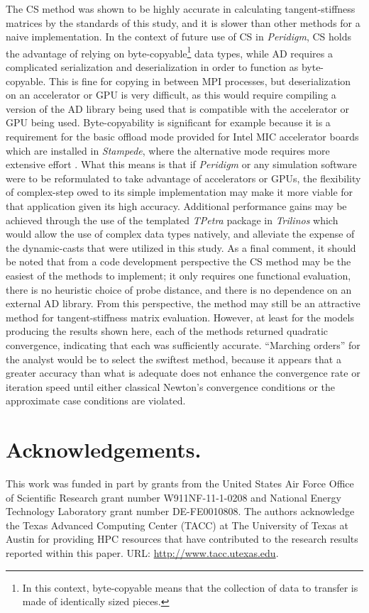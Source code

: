 \documentclass[preprint,12pt]{elsarticle}
\begin{document}
The CS method was shown to be highly accurate in calculating tangent-stiffness matrices by the standards of this study, and it is slower than other methods for a naive implementation. In the context of future use of CS in \emph{Peridigm}, CS holds the advantage of relying on byte-copyable\footnote{In this context,  byte-copyable means that the collection of data to transfer is made of identically sized pieces.} data types, while AD requires a complicated serialization and deserialization in order to function as byte-copyable. This is fine for copying in between MPI processes, but deserialization on an accelerator or GPU is very difficult, as this would require compiling a version of the AD library being used that is compatible with the accelerator or GPU being used.  Byte-copyability is significant for example because it is a requirement for the basic offload mode provided for Intel MIC accelerator boards which are installed in \emph{Stampede}, where the alternative mode requires more extensive effort \cite{intel_byte_copyable}. What this means is that if \emph{Peridigm} or any simulation software were to be reformulated to take advantage of accelerators or GPUs, the flexibility of complex-step owed to its simple implementation may make it more viable for that application given its high accuracy. Additional performance gains may be achieved through the use of the templated \emph{TPetra} package in \emph{Trilinos} which would allow the use of complex data types natively, and alleviate the expense of the dynamic-casts that were utilized in this study.  As a final comment, it should be noted that from a code development perspective the CS method may be the easiest of the methods to implement; it only requires one functional evaluation, there is no heuristic choice of probe distance, and there is no dependence on an external AD library.  From this perspective, the method may still be an attractive method for tangent-stiffness matrix evaluation. However, at least for the models producing the results shown here, each of the methods returned quadratic convergence, indicating that each was sufficiently accurate. ``Marching orders'' for the analyst would be to select the swiftest method, because it appears that a greater accuracy than what is adequate does not enhance the convergence rate or iteration speed until either classical Newton's convergence conditions or the approximate case conditions are violated. 

\section{Acknowledgements.}
\label{sec:ack}
This work was funded in part by grants from the United States Air Force Office of Scientific Research grant number W911NF-11-1-0208 and National Energy Technology Laboratory grant number DE-FE0010808. The authors acknowledge the Texas Advanced Computing Center (TACC) at The University of Texas at Austin for providing HPC resources that have contributed to the research results reported within this paper. URL: \url{http://www.tacc.utexas.edu}.
\end{document}
